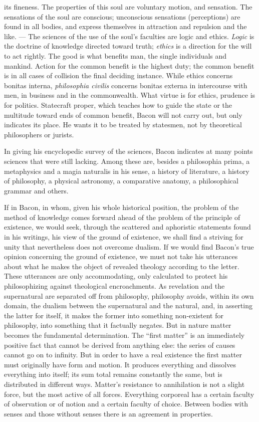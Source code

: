 its fineness. The properties of this soul are voluntary motion,
and sensation. The sensations of the soul are conscious; unconscious sensations (perceptions) are found in all bodies,
and express themselves in attraction and repulsion and the like. --- The sciences of the use of the soul's faculties are logic and ethics.
\emph{Logic} is the doctrine of knowledge directed toward truth; \emph{ethics} is a direction for the will to act rightly.
The good is what benefits man, the single individuals
and mankind. Action for the common benefit is the highest
duty; the common benefit is in all cases of collision the final
deciding instance. While ethics concerns bonitas interna,
\emph{philosophia civilis} concerns bonitas externa in intercourse with
men, in business and in the commonwealth. What virtue is
for ethics, prudence is for politics. Statecraft proper, which teaches how to guide the state or the multitude toward ends of common benefit, Bacon will not carry out, but only indicates its
place. He wants it to be treated by statesmen, not by
theoretical philosophers or jurists.

In giving his encyclopedic survey of the sciences, Bacon indicates at many points sciences that
were still lacking. Among these are, besides a philosophia
prima, a metaphysics and a magia naturalis in his sense, a history of literature, a history of philosophy, a physical astronomy, a comparative anatomy, a philosophical
grammar and others.

\divrule

If in Bacon, in whom, given his whole historical
position, the problem of the method of knowledge comes forward
ahead of the problem of the principle of existence, we would seek, through the scattered
and aphoristic statements found in his writings,
his view of the ground of existence, we shall find a striving
for unity that nevertheless does not overcome dualism. If we would
find Bacon's true opinion concerning the ground of existence,
we must not take his utterances about what he makes the object of
revealed theology according to the letter. These
utterances are only accommodating, only calculated to protect his philosophizing against theological encroachments. As
revelation and the supernatural are separated off from philosophy,
philosophy avoids, within its own domain, the dualism between the
supernatural and the natural, and, in asserting the
latter for itself, it makes the former into something non-existent for philosophy, into something that it factually negates. But in nature matter becomes the fundamental determination. The ``first matter'' is an immediately positive fact that cannot be derived from anything else: the series of causes cannot go on to
infinity. But in order to have a real existence the
first matter must originally have form and motion. It produces everything and dissolves everything into itself; its sum total remains
constantly the same, but is distributed in different ways.
Matter's resistance to annihilation is not a slight force,
but the most active of all forces. Everything corporeal has a certain
faculty of observation or of notion and a certain faculty of choice.
Between bodies with senses and those without senses there
is an agreement in properties.

